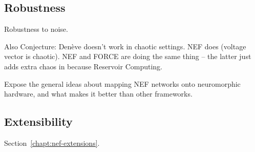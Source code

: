 \subsection{Robustness}
\label{sec:nef-robustness}

Robustness to noise.

Also Conjecture: Den\`eve doesn't work in chaotic settings. NEF does (voltage vector is chaotic). NEF and FORCE are doing the same thing -- the latter just adds extra chaos in because Reservoir Computing.



Expose the general ideas about mapping NEF networks onto neuromorphic hardware, and what makes it better than other frameworks.


\subsection{Extensibility}
\label{sec:nef-extensibility}

Section~\ref{chapt:nef-extensions}.
